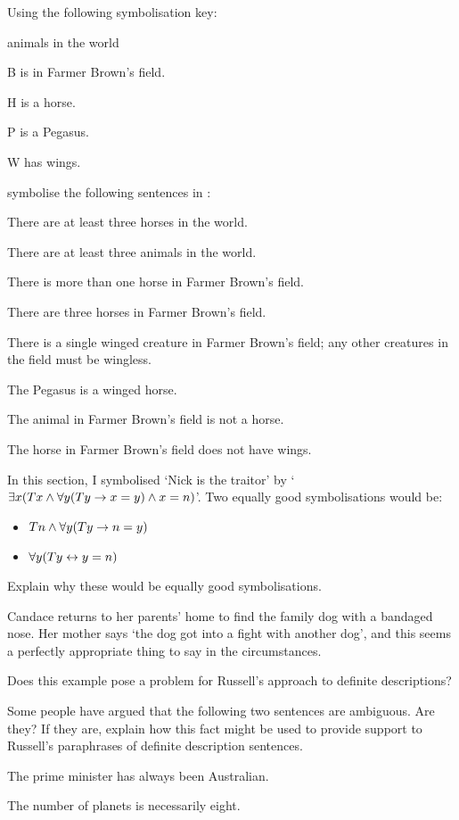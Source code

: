 \problempart Using the following symbolisation key:
\begin{ekey}
\item[\text{domain}] animals in the world
\item[B\meta{x}]  is in Farmer Brown's field.
\item[H\meta{x}]  is a horse.
\item[P\meta{x}]  is a Pegasus.
\item[W\meta{x}]  has wings.
\end{ekey}
symbolise the following sentences in \FOL:
\begin{earg}
\item There are at least three horses in the world.
\item There are at least three animals in the world.
\item There is more than one horse in Farmer Brown's field.
\item There are three horses in Farmer Brown's field.
\item There is a single winged creature in Farmer Brown's field; any other creatures in the field must be wingless.
\item The Pegasus is a winged horse.
\item The animal in Farmer Brown's field is not a horse.
\item The horse in Farmer Brown's field does not have wings.
\end{earg}

\problempart
In this section, I symbolised `Nick is the traitor' by `$\exists x (Tx \wedge \forall y(Ty \rightarrow x = y) \wedge x = n)$'. Two equally good symbolisations would be:
	\begin{itemize}
		\item $Tn \wedge \forall y(Ty \rightarrow n = y)$
		\item $\forall y(Ty \leftrightarrow y = n)$
	\end{itemize}
Explain why these would be equally good symbolisations.

\problempart
Candace returns to her parents' home to find the family dog with a bandaged nose. Her mother says `the dog got into a fight with another dog', and this seems a perfectly appropriate thing to say in the circumstances. 

Does this example pose a problem for Russell's approach to definite descriptions?




\problempart
Some people have argued that the following two sentences are ambiguous. Are they? If they are, explain how this fact might be used to provide support to Russell's paraphrases of definite description sentences. \begin{earg}
	\item The prime minister has always been Australian.
	\item The number of planets is necessarily eight.
\end{earg}

